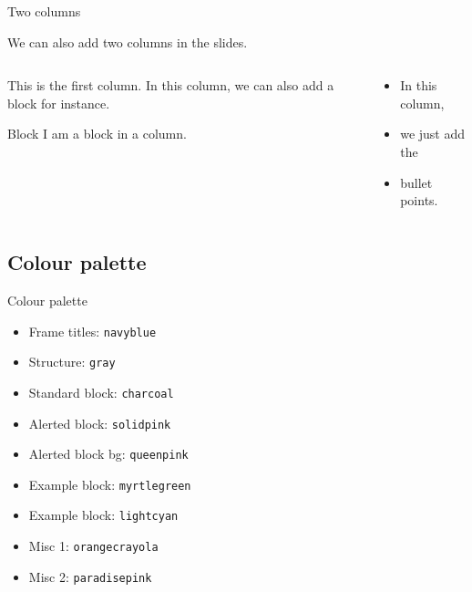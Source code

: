 \documentclass[,]{beamer}
\providecommand{\tightlist}{%
  \setlength{\itemsep}{0pt}\setlength{\parskip}{0pt}}
\begin{document}
\begin{frame}{Two columns}
\protect\hypertarget{two-columns}{}

We can also add two columns in the slides.

\begin{columns}[t]
            \begin{column}[T]{0.4\textwidth}
                This is the first column. In this column, we can also add a block for instance.
                \vspace{1em}
                \begin{block}{Block}
                    I am a block in a column.
                \end{block}
            \end{column}
            \begin{column}[T]{0.4\textwidth}
                \begin{itemize}
                    \item In this column,
                    \item we just add the
                    \item bullet points.
                \end{itemize}
            \end{column}
        \end{columns}

\end{frame}

\hypertarget{colour-palette}{%
\subsection{Colour palette}\label{colour-palette}}

\begin{frame}{Colour palette}
\protect\hypertarget{colour-palette-1}{}

\begin{itemize}
\tightlist
\item
  \color{navyblue} Frame titles: \texttt{navyblue}
\item
  \color{gray} Structure: \texttt{gray}
\item
  \color{charcoal} Standard block: \texttt{charcoal}
\item
  \color{solidpink} Alerted block: \texttt{solidpink}
\item
  \color{queenpink} Alerted block bg: \texttt{queenpink}
\item
  \color{myrtlegreen} Example block: \texttt{myrtlegreen}
\item
  \color{lightcyan} Example block: \texttt{lightcyan}
\item
  \color{orangecrayola} Misc 1: \texttt{orangecrayola}
\item
  \color{paradisepink} Misc 2: \texttt{paradisepink}
\end{itemize}

\end{frame}
\end{document}
